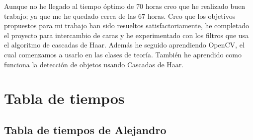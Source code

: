 \documentclass[a4paper]{article}
\begin{document}
Aunque no he llegado al tiempo óptimo de 70 horas creo que he realizado buen trabajo; ya que me he quedado cerca de las 67 horas.
Creo que los objetivos propuestos para mi trabajo han sido resueltos satisfactoriamente, he completado el proyecto para intercambio de caras y he experimentado con los filtros que usa el algoritmo de cascadas de Haar.
Además he seguido aprendiendo OpenCV, el cual comenzamos a usarlo en las clases de teoría.
También he aprendido como funciona la detección de objetos usando Cascadas de Haar.

\section{Tabla de tiempos}

\subsection{Tabla de tiempos de Alejandro}

\newpage
\end{document}
